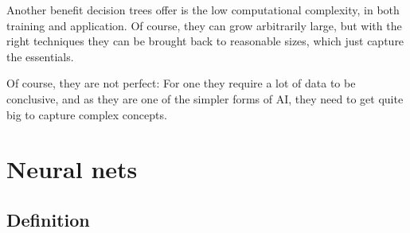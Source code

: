 Another benefit decision trees offer is the low computational complexity, in both training and application. Of course, they can grow arbitrarily large, but with the right techniques %
they can be brought back to reasonable sizes, which just capture the essentials.

Of course, they are not perfect: For one they require a lot of data to be conclusive, and as they are one of the simpler forms of AI, they need to get quite big to capture complex concepts.

\section{Neural nets}
\subsection{Definition}

